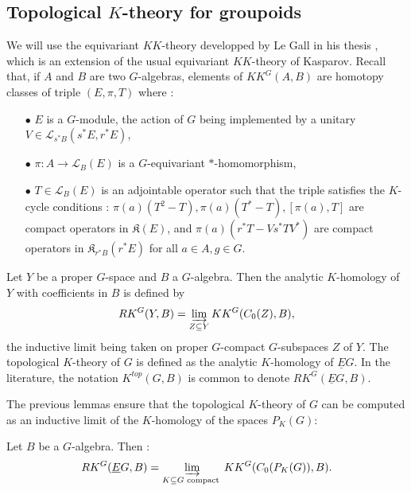 \subsection{Topological $K$-theory for groupoids}

We will use the equivariant $KK$-theory developped by Le Gall in his thesis \cite{LeGall}, which is an extension of the usual equivariant $KK$-theory of Kasparov. Recall that, if $A$ and $B$ are two $G$-algebras, elements of $KK^G(A,B)$ are homotopy classes of triple $(E,\pi,T)$ where :\\

\begin{itemize}
\item[$\bullet$] $E$ is a $G$-module, the action of $G$ being implemented by a unitary $V\in\mathcal L_{s^* B}(s^* E, r^* E)$,
\item[$\bullet$] $\pi : A\rightarrow \mathcal L_B(E)$ is a $G$-equivariant $*$-homomorphism,
\item[$\bullet$] $T\in \mathcal L_B(E)$ is an adjointable operator such that the triple satisfies the $K$-cycle conditions : $\pi(a)(T^2-T),\pi(a)(T^*-T),[\pi(a),T]$ are compact operators in $\mathfrak K(E)$, and $\pi(a)(r^*T-V s^*T V^*)$ are compact operators in $\mathfrak K_{r^* B}(r^* E)$ for all $a\in A, g\in G$.\\
\end{itemize}

\begin{definition}
Let $Y$ be a proper $G$-space and $B$ a $G$-algebra. Then the analytic $K$-homology of $Y$ with coefficients in $B$ is defined by 
\[RK^G(Y,B) = \varinjlim_{Z\subseteq Y} KK^G(C_0(Z),B), \]
the inductive limit being taken on proper $G$-compact $G$-subspaces $Z$ of $Y$. The topological $K$-theory of $G$ is defined as the analytic $K$-homology of $\underline E G$. In the literature, the notation $K^{top}(G,B)$ is common to denote $RK^G(\underline E G,B)$.
\end{definition}

The previous lemmas ensure that the topological $K$-theory of $G$ can be computed as an inductive limit of the $K$-homology of the spaces $P_K(G)$:
\begin{lem}\label{Khomology} Let $B$ be a $G$-algebra. Then :
\[RK^G(\underline E G,B) = \varinjlim_{K\subseteq G \text{ compact }} KK^G(C_0(P_K(G)),B).\]
\end{lem}

